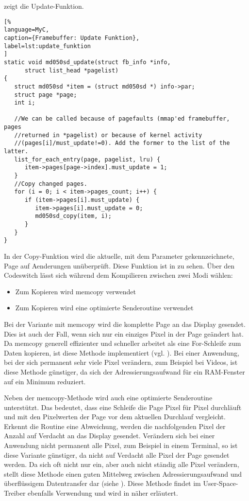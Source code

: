  zeigt die Update-Funktion.
\begin{lstlisting}[%
language=MyC,
caption={Framebuffer: Update Funktion},
label=lst:update_funktion
]
static void md050sd_update(struct fb_info *info,
      struct list_head *pagelist)
{
   struct md050sd *item = (struct md050sd *) info->par;
   struct page *page;
   int i;

   //We can be called because of pagefaults (mmap'ed framebuffer, pages
   //returned in *pagelist) or because of kernel activity
   //(pages[i]/must_update!=0). Add the former to the list of the latter.
   list_for_each_entry(page, pagelist, lru) {
      item->pages[page->index].must_update = 1;
   }
   //Copy changed pages.
   for (i = 0; i < item->pages_count; i++) {
      if (item->pages[i].must_update) {
         item->pages[i].must_update = 0;
         md050sd_copy(item, i);
      }
   }
}
\end{lstlisting}
In der Copy-Funktion wird die aktuelle, mit dem Parameter  gekennzeichnete, Page auf Aenderungen unüberprüft. Diese Funktion ist in  zu sehen. Über den Codeswitch  lässt sich während dem Kompilieren zwischen zwei Modi wählen:
\begin{itemize}
	\item Zum Kopieren wird memcopy verwendet
	\item Zum Kopieren wird eine optimierte Senderoutine verwendet
\end{itemize}

Bei der Variante mit memcopy wird die komplette Page an das Display gesendet. Dies ist auch der Fall, wenn sich nur ein einziges Pixel in der Page geändert hat. Da memcopy generell effizienter und schneller arbeitet als eine For-Schleife zum Daten kopieren, ist diese Methode implementiert (vgl. \cite{Nadeau2012}). Bei einer Anwendung, bei der sich permanent sehr viele Pixel verändern, zum Beispiel bei Videos, ist diese Methode günstiger, da sich der Adressierungsaufwand für ein RAM-Fenster auf ein Minimum reduziert. 

Neben der memcopy-Methode wird auch eine optimierte Senderoutine unterstützt. Das bedeutet, dass eine Schleife die Page Pixel für Pixel durchläuft und mit den Pixelwerten der Page vor dem aktuellen Durchlauf vergleicht. Erkennt die Routine eine Abweichung, werden die nachfolgenden Pixel der Anzahl  auf Verdacht an das Display gesendet. Verändern sich bei einer Anwendung nicht permanent alle Pixel, zum Beispiel in einem Terminal, so ist diese Variante günstiger, da nicht auf Verdacht alle Pixel der Page gesendet werden. Da sich oft nicht nur ein, aber auch nicht ständig alle Pixel  verändern, stellt diese Methode einen guten Mittelweg zwischen Adressierungsaufwand und überflüssigem Datentransfer dar (siehe \cite{Schlegel2013a}). Diese Methode findet im User-Space-Treiber ebenfalls Verwendung und wird in  näher erläutert.

